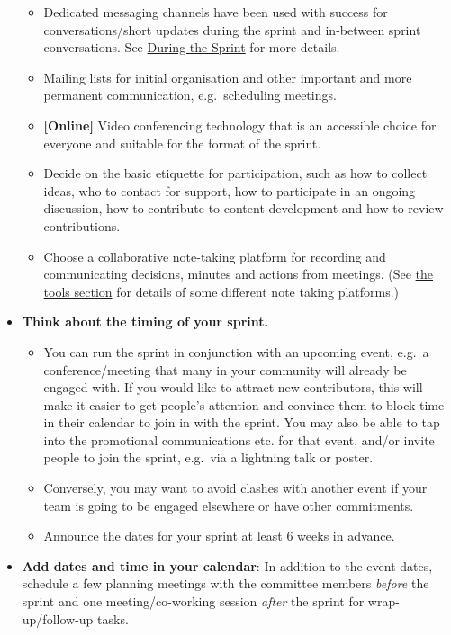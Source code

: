 \documentclass[
]{book}
\providecommand{\tightlist}{%
  \setlength{\itemsep}{0pt}\setlength{\parskip}{0pt}}
\begin{document}
\begin{itemize}
  \begin{itemize}
  \tightlist
  \item
    Dedicated messaging channels have been used with success for conversations/short updates during the sprint and in-between sprint conversations.
    See \protect\hyperlink{during-the-sprint}{During the Sprint} for more details.
  \item
    Mailing lists for initial organisation and other important and more permanent communication, e.g.~scheduling meetings.
  \item
    \textbf{{[}Online{]}} Video conferencing technology that is an accessible choice for everyone and suitable for the format of the sprint.
  \item
    Decide on the basic etiquette for participation, such as how to collect ideas, who to contact for support, how to participate in an ongoing discussion, how to contribute to content development and how to review contributions.
  \item
    Choose a collaborative note-taking platform for recording and communicating decisions, minutes and actions from meetings. (See \protect\hyperlink{tools-and-resources}{the tools section} for details of some different note taking platforms.)
  \end{itemize}
\item
  \textbf{Think about the timing of your sprint.}

  \begin{itemize}
  \tightlist
  \item
    You can run the sprint in conjunction with an upcoming event, e.g.~a conference/meeting that many in your community will already be engaged with.
    If you would like to attract new contributors, this will make it easier to get people's attention and
    convince them to block time in their calendar to join in with the sprint.
    You may also be able to tap into the promotional communications etc. for that event,
    and/or invite people to join the sprint, e.g.~via a lightning talk or poster.
  \item
    Conversely, you may want to avoid clashes with another event if your team is going to be engaged elsewhere or have other commitments.
  \item
    Announce the dates for your sprint at least 6 weeks in advance.
  \end{itemize}
\item
  \textbf{Add dates and time in your calendar}: In addition to the event dates, schedule a few planning meetings with the committee members \emph{before} the sprint and one meeting/co-working session \emph{after} the sprint for wrap-up/follow-up tasks.


\end{itemize}
\end{document}
